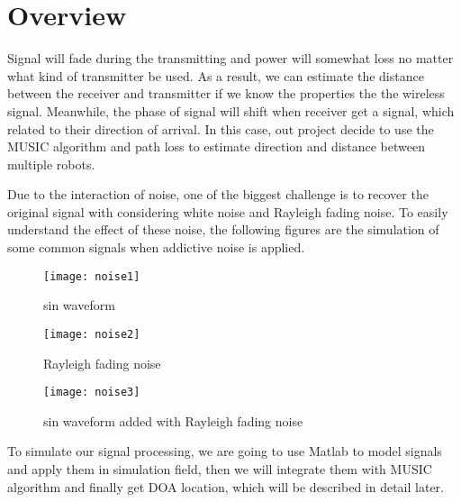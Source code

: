 
\section{Overview}
\label{sec:overview}
	Signal will fade during the transmitting and power will somewhat loss no matter what kind of transmitter be used. As a result, we can estimate the distance between the receiver and transmitter if we know the properties the the wireless signal. Meanwhile, the phase of signal will shift when receiver get a signal, which related to their direction of arrival. In this case, out project decide to use the MUSIC algorithm and path loss to estimate direction and distance between multiple robots.\\
	\par
	Due to the interaction of noise, one of the biggest challenge is to recover the original signal with considering white noise and Rayleigh fading noise. To easily understand the effect of these noise, the following figures are the simulation of some common signals when addictive noise is applied.\\
	\begin{figure}[h]
	
	\begin{minipage}[t]{0.3\linewidth}
	\centering
	\texttt{[image: noise1]}
	\caption{sin waveform}
	\end{minipage}
	
	\begin{minipage}[t]{0.3\linewidth}
	\centering
	\texttt{[image: noise2]}
	\caption{Rayleigh fading noise}
	\end{minipage}

	\begin{minipage}[t]{0.3\linewidth}
	\centering
	\texttt{[image: noise3]}
	\caption{sin waveform added with Rayleigh fading noise}
	\end{minipage}

	\end{figure}
	
	\par
	To simulate our signal processing, we are going to use Matlab to model signals and apply them in simulation field, then we will integrate them with MUSIC algorithm and finally get DOA location, which will be described in detail later. 


